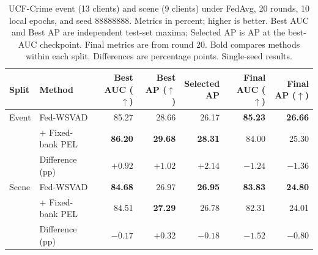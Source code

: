 \begin{table}[t]
  \centering
  \caption{UCF-Crime event (13 clients) and scene (9 clients) under FedAvg, 20 rounds, 10 local epochs, and seed 88888888. Metrics in percent; higher is better. Best AUC and Best AP are independent test-set maxima; Selected AP is AP at the best-AUC checkpoint. Final metrics are from round 20. Bold compares methods within each split. Differences are percentage points. Single-seed results.}
  \label{tab:ucf-event-scene-fixed-bank-pel-complete-ap}
  \small
  \setlength{\tabcolsep}{4pt}
  \begin{tabular}{llrrrrr}
    \toprule
    Split & Method & \shortstack{Best AUC\\($\uparrow$)} & \shortstack{Best AP\\($\uparrow$)} & \shortstack{Selected\\AP} & \shortstack{Final AUC\\($\uparrow$)} & \shortstack{Final AP\\($\uparrow$)} \\
    \midrule
    Event & Fed-WSVAD & 85.27 & 28.66 & 26.17 & \textbf{85.23} & \textbf{26.66} \\
     & + Fixed-bank PEL & \textbf{86.20} & \textbf{29.68} & \textbf{28.31} & 84.00 & 25.30 \\
    & Difference (pp) & $+0.92$ & $+1.02$ & $+2.14$ & $-1.24$ & $-1.36$ \\
    \midrule
    Scene & Fed-WSVAD & \textbf{84.68} & 26.97 & \textbf{26.95} & \textbf{83.83} & \textbf{24.80} \\
     & + Fixed-bank PEL & 84.51 & \textbf{27.29} & 26.78 & 82.31 & 24.01 \\
    & Difference (pp) & $-0.17$ & $+0.32$ & $-0.18$ & $-1.52$ & $-0.80$ \\
    \bottomrule
  \end{tabular}
\end{table}
